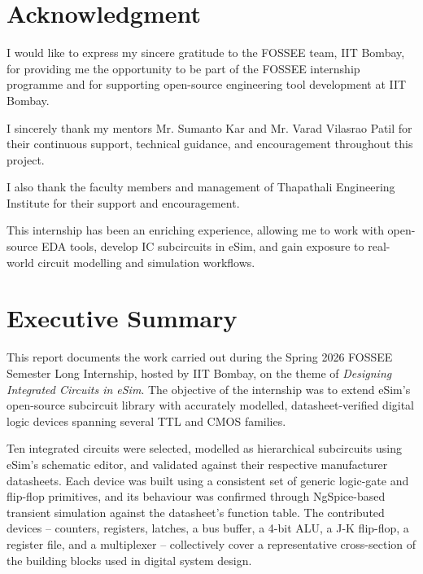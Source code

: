 \documentclass[12pt,a4paper]{report}
\begin{document}
\chapter*{Acknowledgment}

I would like to express my sincere gratitude to the FOSSEE team, IIT
Bombay, for providing me the opportunity to be part of the FOSSEE
internship programme and for supporting open-source engineering tool
development at IIT Bombay.

\vspace{0.3cm}
I sincerely thank my mentors Mr. Sumanto Kar and Mr. Varad Vilasrao Patil
for their continuous support, technical guidance, and encouragement
throughout this project.

\vspace{0.3cm}
I also thank the faculty members and management of Thapathali Engineering
Institute for their support and encouragement.

\vspace{0.3cm}
This internship has been an enriching experience, allowing me to work
with open-source EDA tools, develop IC subcircuits in eSim, and gain
exposure to real-world circuit modelling and simulation workflows.

\newpage

\chapter*{Executive Summary}

This report documents the work carried out during the Spring 2026 FOSSEE
Semester Long Internship, hosted by IIT Bombay, on the theme of
\emph{Designing Integrated Circuits in eSim}. The objective of the
internship was to extend eSim's open-source subcircuit library with
accurately modelled, datasheet-verified digital logic devices spanning
several TTL and CMOS families.

Ten integrated circuits were selected, modelled as hierarchical
subcircuits using eSim's schematic editor, and validated against their
respective manufacturer datasheets. Each device was built using a
consistent set of generic logic-gate and flip-flop primitives, and its
behaviour was confirmed through NgSpice-based transient simulation
against the datasheet's function table. The contributed devices --
counters, registers, latches, a bus buffer, a 4-bit ALU, a J-K flip-flop,
a register file, and a multiplexer -- collectively cover a representative
cross-section of the building blocks used in digital system design.
\end{document}
